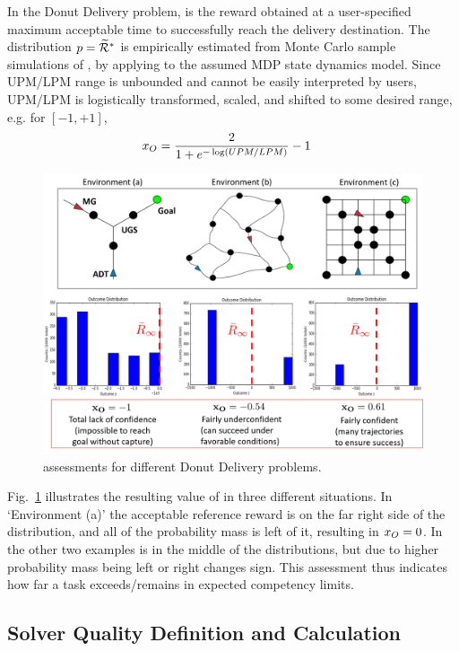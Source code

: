 In the Donut Delivery problem, \riref{} is the reward obtained at a user-specified maximum acceptable time to successfully reach the delivery destination. The distribution $p = \widetilde{\mathcal{R}}^*$ is empirically estimated from Monte Carlo sample simulations of \rwdopt, by applying \piopt{} to the assumed MDP state dynamics model. Since UPM/LPM range is unbounded %
and cannot be easily interpreted by users, UPM/LPM is logistically transformed, scaled, and shifted to some desired range, e.g. for $[-1,+1]$, 
    \begin{align}
        \xO &= \frac{2}{1+e^{-\log\left(\mbox{\tiny UPM/LPM}\right)}}-1 \label{eq:xO}
    \end{align}
    \begin{figure}[tbp]
        \centering
        \includegraphics[width=0.75\linewidth]{Figures/xO_EnvsRewardsOnly.png}
        \caption{\xO{} assessments for different Donut Delivery problems.}
        \label{fig:xOexample}
        \vspace{-0.5 cm}
    \end{figure}
\noindent Fig.~\ref{fig:xOexample} illustrates the resulting value of \xO{} in three different situations. In `Environment (a)' the acceptable reference reward \ris{} is on the far right side of the distribution, and all of the probability mass is left of it, resulting in $x_O=0$. In the other two examples \ris{} is in the middle of the distributions, but due to higher probability mass being left or right \xO{} changes sign. This assessment thus indicates how far a task exceeds/remains in expected competency limits. 

\subsection{Solver Quality Definition and Calculation} \label{sec:xQ}


